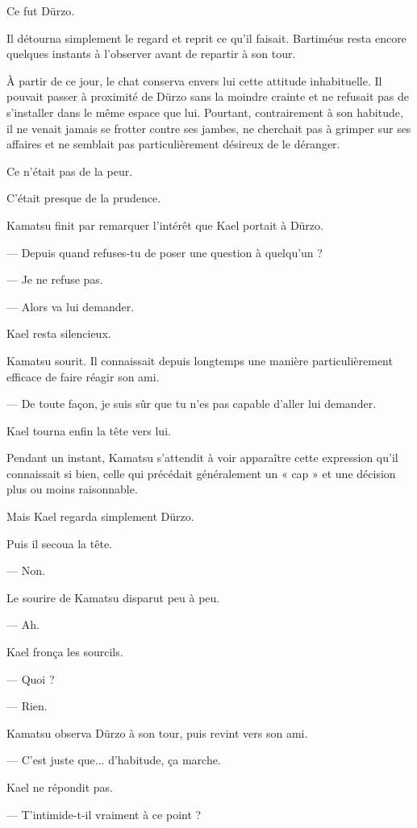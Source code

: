 Ce fut Dürzo.

Il détourna simplement le regard et reprit ce qu'il faisait. Bartiméus resta
encore quelques instants à l'observer avant de repartir à son tour.

À partir de ce jour, le chat conserva envers lui cette attitude inhabituelle.
Il pouvait passer à proximité de Dürzo sans la moindre crainte et ne refusait
pas de s'installer dans le même espace que lui. Pourtant, contrairement à son
habitude, il ne venait jamais se frotter contre ses jambes, ne cherchait pas à
grimper sur ses affaires et ne semblait pas particulièrement désireux de le
déranger.

Ce n'était pas de la peur.

C'était presque de la prudence.

\scenebreak

Kamatsu finit par remarquer l'intérêt que Kael portait à Dürzo.

— Depuis quand refuses-tu de poser une question à quelqu'un ?

— Je ne refuse pas.

— Alors va lui demander.

Kael resta silencieux.

Kamatsu sourit. Il connaissait depuis longtemps une manière particulièrement
efficace de faire réagir son ami.

— De toute façon, je suis sûr que tu n'es pas capable d'aller lui demander.

Kael tourna enfin la tête vers lui.

Pendant un instant, Kamatsu s'attendit à voir apparaître cette expression qu'il
connaissait si bien, celle qui précédait généralement un « cap » et une décision
plus ou moins raisonnable.

Mais Kael regarda simplement Dürzo.

Puis il secoua la tête.

— Non.

Le sourire de Kamatsu disparut peu à peu.

— Ah.

Kael fronça les sourcils.

— Quoi ?

— Rien.

Kamatsu observa Dürzo à son tour, puis revint vers son ami.

— C'est juste que... d'habitude, ça marche.

Kael ne répondit pas.

— T'intimide-t-il vraiment à ce point ?

